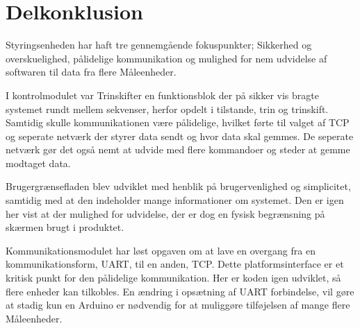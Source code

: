 
\section{Delkonklusion}

Styringsenheden har haft tre gennemgående fokuspunkter; Sikkerhed og overskuelighed, pålidelige kommunikation og mulighed for nem udvidelse af softwaren til data fra flere Måleenheder.


I kontrolmodulet var Trinskifter en funktionsblok der på sikker vis bragte systemet rundt mellem sekvenser, herfor opdelt i tilstande, trin og trinskift. Samtidig skulle kommunikationen være pålidelige, hvilket førte til valget af TCP og seperate netværk der styrer data sendt og hvor data skal gemmes. De seperate netværk gør det også nemt at udvide med flere kommandoer og steder at gemme modtaget data.


Brugergrænsefladen blev udviklet med henblik på brugervenlighed og simplicitet, samtidig med at den indeholder mange informationer om systemet. Den er igen her vist at der mulighed for udvidelse, der er dog en fysisk begrænsning på skærmen brugt i produktet.

Kommunikationsmodulet har løst opgaven om at lave en overgang fra en kommunikationsform, UART, til en anden, TCP. Dette platformsinterface er et kritisk punkt for den pålidelige kommunikation. Her er koden igen udviklet, så flere enheder kan tilkobles. En ændring i opsætning af UART forbindelse, vil gøre at stadig kun en Arduino er nødvendig for at muliggøre tilføjelsen af mange flere Måleenheder.
